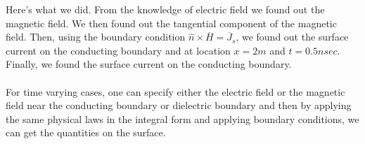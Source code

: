 Here's what we did. From the knowledge of electric field we found out the magnetic field. We then found out the tangential component of the magnetic field. Then, using the boundary condition $\hat{n}\times\overline{H} = \overline{J}_s$, we found out the surface current on the conducting boundary and at location $x = 2m$ and $t = 0.5nsec$. Finally, we found the surface current on the conducting boundary.\\ \\
For time varying cases, one can specify either the electric field or the magnetic field near the conducting boundary or dielectric boundary and then by applying the same physical laws in the integral form and applying boundary conditions, we can get the quantities on the surface.
  